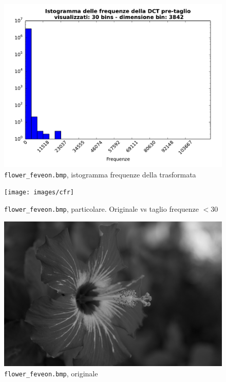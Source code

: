\documentclass[11pt,a4paper]{scrartcl}
\begin{document}
\begin{figure}[!ht]
\centering
\includegraphics[scale=0.6]{images/hist_fiore_30_pre} 
\caption{\texttt{flower\_feveon.bmp}, istogramma frequenze della trasformata}
\end{figure}

\begin{figure}[!ht]
\centering
\texttt{[image: images/cfr]} 
\caption{\texttt{flower\_feveon.bmp}, particolare. Originale vs taglio frequenze $< 30$}
\end{figure}

\begin{figure}[!ht]
\centering
\includegraphics[scale=0.29]{images/flower_foveon} 
\caption{\texttt{flower\_feveon.bmp}, originale}
\end{figure}
\end{document}
